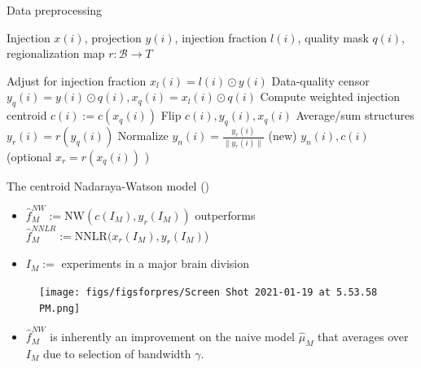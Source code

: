 \documentclass{beamer}
\begin{document}
\begin{frame}[fragile]{Data preprocessing}

\begin{minipage}{1.\linewidth}

\begin{algorithm}[H]{Injection $x(i)$, projection $y(i)$,  injection fraction $l(i)$, quality mask $q(i)$, regionalization map $r: \mathcal B \to T$}
\scriptsize
\begin{algorithmic}[1]
\STATE Adjust for injection fraction $x_l (i) = l(i) \odot y(i)$
\STATE Data-quality censor $y_q (i) = y (i) \odot q(i), x_q(i) = x_l (i) \odot q(i)$
\STATE Compute weighted injection centroid $c(i) := c(x_q(i))$
 \STATE Flip $c(i), y_q (i), x_q(i)$
\ENDIF 
\STATE Average/sum structures $y_r (i) = r(y_q (i))$%
\STATE Normalize $ y_n(i) = \frac{y_r (i)}{\|y_r (i)\|}$ (new) %
\RETURN $ y_n(i), c(i)$ (optional $x_r = r( x_q(i))$ )
\end{algorithmic}
\end{algorithm}
\end{minipage}
\end{frame}

\begin{frame}{The centroid Nadaraya-Watson model (\citeauthor{Knox2019-ot})}
\begin{itemize}
    \item $\hat f_M^{NW} := \text{NW}  (c(I_M),  y_r(I_M))$ outperforms $\hat f_M^{NNLR} :=  \text{NNLR}(x_r(I_M), y_r(I_M)$) 
    \item $I_M := $ experiments in a major brain division
\end{itemize}
\begin{figure}
    \centering
    \texttt{[image: figs/figsforpres/Screen Shot 2021-01-19 at 5.53.58 PM.png]}
    \caption{\citeauthor{Knox2019-ot}}
    \label{fig:my_label}
\end{figure}
\begin{itemize}
    \item $\hat  f_M^{NW}$ is inherently an improvement on the naive model $\hat \mu_M$ that averages over $I_M$ due to selection of bandwidth $\gamma$.
\end{itemize}
\end{frame}
\end{document}
